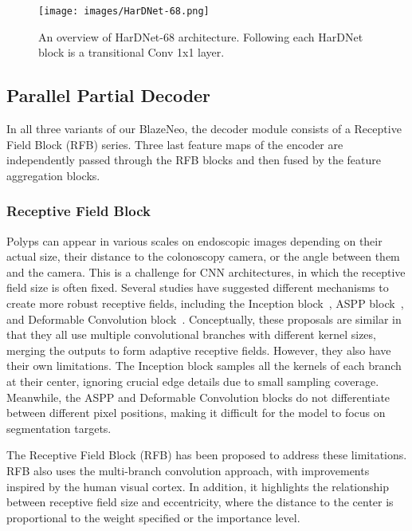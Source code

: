 \documentclass{ieeeaccess}
\newcommand{\ModelName}{BlazeNeo\xspace}
\begin{document}
\begin{center}
    \begin{figure}[th]
        \begin{center}
            \texttt{[image: images/HarDNet-68.png]}
        \end{center}
        \caption{An overview of HarDNet-68 architecture. Following each HarDNet block is a transitional Conv 1x1 layer.}
        \label{fig:hardnet-68}
    \end{figure}
\end{center}

\subsection{Parallel Partial Decoder}
In all three variants of our \ModelName, the decoder module consists of a Receptive Field Block (RFB) series. Three last feature maps of the encoder are independently passed through the RFB blocks and then fused by the feature aggregation blocks.


\subsubsection{Receptive Field Block}

Polyps can appear in various scales on endoscopic images depending on their actual size, their distance to the colonoscopy camera, or the angle between them and the camera. This is a challenge for CNN architectures, in which the receptive field size is often fixed. Several studies have suggested different mechanisms to create more robust receptive fields, including the Inception block~\cite{szegedy2015going}, ASPP block~\cite{chen2017deeplab}, and Deformable Convolution block~\cite{dai2017deformable}. Conceptually, these proposals are similar in that they all use multiple convolutional branches with different kernel sizes, merging the outputs to form adaptive receptive fields. However, they also have their own limitations. The Inception block samples all the kernels of each branch at their center, ignoring crucial edge details due to small sampling coverage. Meanwhile, the ASPP and Deformable Convolution blocks do not differentiate between different pixel positions, making it difficult for the model to focus on segmentation targets.

The Receptive Field Block (RFB) \cite{liu2018receptive} has been proposed to address these limitations. RFB also uses the multi-branch convolution approach, with improvements inspired by the human visual cortex. In addition, it highlights the relationship between receptive field size and eccentricity, where the distance to the center is proportional to the weight specified or the importance level.
\end{document}

